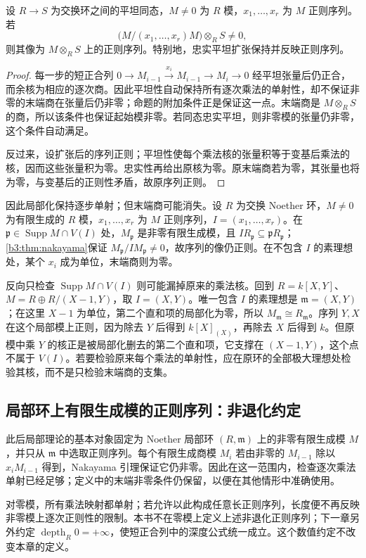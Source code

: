 \begin{proposition}\label{b3:prop:regular-sequence-base-change}
	设 \(R\rightarrow S\) 为交换环之间的平坦同态，\(M\ne0\) 为 \(R\) 模，\(x_1,\ldots,x_r\) 为 \(M\) 正则序列。若
	\[
		\bigl(M/(x_1,\ldots,x_r)M\bigr)\otimes_RS\ne0,
	\]
	则其像为 \(M\otimes_RS\) 上的正则序列。特别地，忠实平坦扩张保持并反映正则序列。
\end{proposition}
\begin{proof}
	每一步的短正合列 \(0\rightarrow M_{i-1}\xrightarrow{x_i}M_{i-1}\rightarrow M_i\rightarrow0\) 经平坦张量后仍正合，而余核为相应的逐次商。因此平坦性自动保持所有逐次乘法的单射性，却不保证非零的末端商在张量后仍非零；命题的附加条件正是保证这一点。末端商是 \(M\otimes_RS\) 的商，所以该条件也保证起始模非零。若同态忠实平坦，则非零模的张量仍非零，这个条件自动满足。

	反过来，设扩张后的序列正则；平坦性使每个乘法核的张量积等于变基后乘法的核，因而这些张量积为零。忠实性再给出原核为零。原末端商若为零，其张量也将为零，与变基后的正则性矛盾，故原序列正则。
\end{proof}

因此局部化保持逐步单射；但末端商可能消失。设 \(R\) 为交换 Noether 环，\(M\ne0\) 为有限生成的 \(R\) 模，\(x_1,\ldots,x_r\) 为 \(M\) 正则序列，\(I=(x_1,\ldots,x_r)\)。在 \(\mathfrak p\in\operatorname{Supp}M\cap V(I)\) 处，\(M_{\mathfrak p}\) 是非零有限生成模，且 \(IR_{\mathfrak p}\subseteq\mathfrak pR_{\mathfrak p}\)；\cref{b3:thm:nakayama}保证 \(M_{\mathfrak p}/IM_{\mathfrak p}\ne0\)，故序列的像仍正则。在不包含 \(I\) 的素理想处，某个 \(x_i\) 成为单位，末端商则为零。

\ProseParagraphBreak
反向只检查 \(\operatorname{Supp}M\cap V(I)\) 则可能漏掉原来的乘法核。回到 \(R=k[X,Y]\)、\(M=R\oplus R/(X-1,Y)\)，取 \(I=(X,Y)\)。唯一包含 \(I\) 的素理想是 \(\mathfrak m=(X,Y)\)；在这里 \(X-1\) 为单位，第二个直和项的局部化为零，所以 \(M_{\mathfrak m}\cong R_{\mathfrak m}\)。序列 \(Y,X\) 在这个局部模上正则，因为除去 \(Y\) 后得到 \(k[X]_{(X)}\)，再除去 \(X\) 后得到 \(k\)。但原模中乘 \(Y\) 的核正是被局部化删去的第二个直和项，它支撑在 \((X-1,Y)\)，这个点不属于 \(V(I)\)。若要检验原来每个乘法的单射性，应在原环的全部极大理想处检验其核，而不是只检验末端商的支集。

\subsection{局部环上有限生成模的正则序列：非退化约定}
\label{b3:subsec:1501:04}

此后局部理论的基本对象固定为 Noether 局部环 \((R,\mathfrak m)\) 上的非零有限生成模 \(M\)，并只从 \(\mathfrak m\) 中选取正则序列。每个有限生成商模 \(M_i\) 若由非零的 \(M_{i-1}\) 除以 \(x_iM_{i-1}\) 得到，Nakayama 引理保证它仍非零。因此在这一范围内，检查逐次乘法单射已经足够；定义中的末端非零条件仍保留，以便在其他情形中准确使用。

\ProseParagraphBreak
对零模，所有乘法映射都单射；若允许以此构成任意长正则序列，长度便不再反映非零模上逐次正则性的限制。本书不在零模上定义上述非退化正则序列；下一章另外约定 \(\operatorname{depth}_R0=+\infty\)，使短正合列中的深度公式统一成立。这个数值约定不改变本章的定义。
